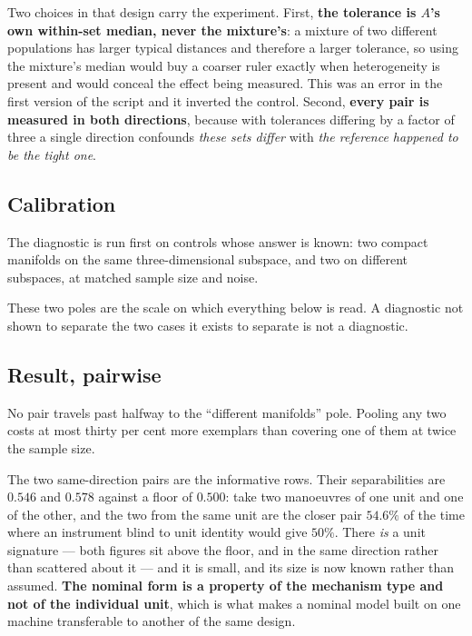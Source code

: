 \documentclass[10pt]{article}
\theoremstyle{plain}
\theoremstyle{definition}
\theoremstyle{remark}
\begin{document}
Two choices in that design carry the experiment. First, \textbf{the tolerance
is $A$'s own within-set median, never the mixture's}: a mixture of two
different populations has larger typical distances and therefore a larger
tolerance, so using the mixture's median would buy a coarser ruler exactly when
heterogeneity is present and would conceal the effect being measured. This was
an error in the first version of the script and it inverted the control.
Second, \textbf{every pair is measured in both directions}, because with
tolerances differing by a factor of three a single direction confounds
\emph{these sets differ} with \emph{the reference happened to be the tight one}.

\subsection*{Calibration}

The diagnostic is run first on controls whose answer is known: two compact
manifolds on the same three-dimensional subspace, and two on different
subspaces, at matched sample size and noise.

\begin{center}\small

\end{center}

These two poles are the scale on which everything below is read. A diagnostic
not shown to separate the two cases it exists to separate is not a diagnostic.

\subsection*{Result, pairwise}

\begin{center}\small

\end{center}

No pair travels past halfway to the ``different manifolds'' pole. Pooling any
two costs at most thirty per cent more exemplars than covering one of them at
twice the sample size.

The two same-direction pairs are the informative rows. Their separabilities are
$0.546$ and $0.578$ against a floor of $0.500$: take two manoeuvres of one unit
and one of the other, and the two from the same unit are the closer pair
$54.6\%$ of the time where an instrument blind to unit identity would give
$50\%$. There \emph{is} a unit signature --- both figures sit above the floor,
and in the same direction rather than scattered about it --- and it is small,
and its size is now known rather than assumed. \textbf{The nominal form is a
property of the mechanism type and not of the individual unit}, which is what
makes a nominal model built on one machine transferable to another of the same
design.
\end{document}
